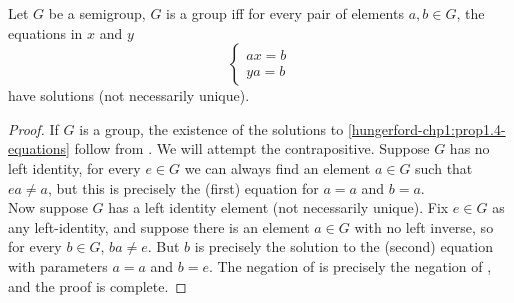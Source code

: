 \documentclass[../main-v2-manifolds.tex]{subfiles}
\begin{document}
\begin{wts}\label{hungerford-chp1:prop1.4}
    Let $G$ be a semigroup, $G$ is a group iff for every pair of elements $a,b\in G$, the equations in $x$ and $y$
    \begin{equation}\label{hungerford-chp1:prop1.4-equations}
        \begin{cases}
            ax=b\\
            ya=b
        \end{cases}
    \end{equation}
    have solutions (not necessarily unique).
\end{wts}
\begin{proof}
    If $G$ is a group, the existence of the solutions to \cref{hungerford-chp1:prop1.4-equations} follow from . We will attempt the contrapositive. Suppose $G$ has no left identity, for every $e\in G$ we can always find an element $a\in G$ such that $ea\neq a$, but this is precisely the (first) equation for $a=a$ and $b=a$. \\

    Now suppose $G$ has a left identity element (not necessarily unique). Fix $e\in G$ as any left-identity, and suppose there is an element $a\in G$ with no left inverse, so for every $b\in G$, $ba\neq e$. But $b$ is precisely the solution to the (second) equation with parameters $a=a$ and $b=e$. The negation of  is precisely the negation of , and the proof is complete.
\end{proof}
\end{document}
